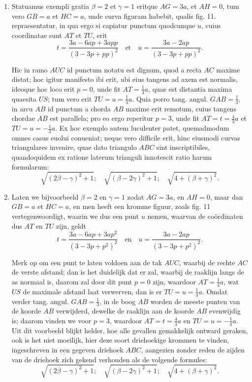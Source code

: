 \documentclass[10pt,a4paper]{article}
\newcommand{\switchenum}{\setcounter{enumi}{\arabic{enumi}-1}\switchcolumn}
\begin{document}
\begin{paracol}{2}
\begin{enumerate}[topsep=1px]
		\item Statuamus exempli gratia $\beta = 2$ et $\gamma = 1$ eritque $AG = 3a$, et $AH = 0$, tum vero $GB = a$ et $HC=a$, unde curva figuram habebit, qualis fig. 11. repraesentatur, in qua ergo si capiatur punctum quodcunque $u$, cuius coordinatae sunt $AT$ et $TU$, erit
		\[
			t = \frac{3a-6ap+3app}{(3-3p+pp)^2} \quad \text{et} \quad u = \frac{3a-2ap}{(3-3p+pp)^2}.
		\]
		\par Hic in ramo $AUC$ id punctum notatu est dignum, quod a recta $AC$ maxime distat; hoc igitur manifesto ibi erit, ubi eius tangens ad axem est normalis, ideoque hoc loco erit $p=0$, unde fit $AT=\frac{1}{3}a$, quae est distantia maxima quaesita $US$; tum vero erit $TU=u=\frac{1}{3}a$. Quia porro tang. angul. $GAB=\frac{1}{3}$, in arcu $AB$ id punctum a chorda $AB$ maxime erit remotum, cuius tangens chordae $AB$ est parallela; pro eo ergo reperitur $p=3$, unde fit $AT= t = \frac{4}{3}a$ et $TU=u=-\frac{1}{3}a$. Ex hoc exemplo autem luculenter patet, quemadmodum omnes casus euolui conueniat; neque vero difficile erit, hinc eiusmodi curvas triangulares invenire, quae dato triangulo $ABC$ sint inscriptibiles, quandoquidem ex ratione laterum trianguli innotescit ratio harum formularum:
		\[
			\sqrt{(2\beta-\gamma)^2+1}; \quad \sqrt{(\beta-2\gamma)^2+1}; \quad  \sqrt{4+(\beta+\gamma)^2}.
		\]
				
		\switchenum
		\item Laten we bijvoorbeeld $\beta = 2$ en $\gamma = 1$ zodat $AG=3a$, en $AH=0$, maar dan $GB = a$ et $HC=a$, en men heeft een kromme figuur, zoals fig. 11 vertegenwoordigt, waarin we dus een punt $u$ nemen, waarvan de coördinaten dus $AT$ en $TU$ zijn, geldt
		\[
			t = \frac{3a-6ap+3ap^2}{(3-3p+p^2)^2} \quad \text{en} \quad u = \frac{3a-2ap}{(3-3p+p^2)^2}.
		\]
		\par Merk op om een punt te laten voldoen aan de tak $AUC$, waarbij de rechte $AC$ de verste afstand; dan is het duidelijk dat er zal, waarbij de raaklijn langs de as normaal is, daarom zal door dit punt $p=0$ zijn, waardoor $AT=\frac{1}{3}a$, wat $US$ de maximale afstand laat verwerven, dan is er $TU=u=\frac{1}{3}a$. Omdat verder tang. angul. $GAB=\frac{1}{3}$, in de boog $AB$ worden de meeste punten van de koorde $AB$ verwijderd, dewelke de raaklijn aan de koorde $AB$ evenwijdig is; daarom vinden we voor $p=3$, waardoor $AT= t = \frac{4}{3}a$ en $TU=u=-\frac{1}{3}a$. Uit dit voorbeeld blijkt helder, hoe alle gevallen gemakkelijk ontward geraken, ook is het niet moeilijk, hier deze soort driehoekige krommen te vinden, ingeschreven in een gegeven driehoek $ABC$, aangezien zonder reden de zijden van de driehoek zich gekend verhouden als de volgende formules:
		\[
			\sqrt{(2\beta-\gamma)^2+1}; \quad \sqrt{(\beta-2\gamma)^2+1}; \quad  \sqrt{4+(\beta+\gamma)^2}.
		\]
		

\end{enumerate}
\end{paracol}
\end{document}
